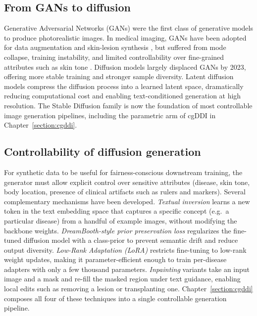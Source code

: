 \documentclass[11pt]{ucthesis}
\begin{document}
\subsection{From GANs to diffusion}

Generative Adversarial Networks (GANs) \cite{goodfellow-2020} were the first class of generative models to produce photorealistic images. In medical imaging, GANs have been adopted for data augmentation \cite{han-2018,Kawahara2018-7pt} and skin-lesion synthesis \cite{abid_2022_meaningfully,sagers-2023}, but suffered from mode collapse, training instability, and limited controllability over fine-grained attributes such as skin tone \cite{qin-2020}. Diffusion models \cite{Ho2020DenoisingDP,dhariwal_2021_diffusion} largely displaced GANs by 2023, offering more stable training and stronger sample diversity. Latent diffusion models \cite{rombach-2022,razzhigaev-2023} compress the diffusion process into a learned latent space, dramatically reducing computational cost and enabling text-conditioned generation at high resolution. The Stable Diffusion family is now the foundation of most controllable image generation pipelines, including the parametric arm of cgDDI in Chapter~\ref{section:cgddi}.

\subsection{Controllability of diffusion generation}

For synthetic data to be useful for fairness-conscious downstream training, the generator must allow explicit control over sensitive attributes (disease, skin tone, body location, presence of clinical artifacts such as rulers and markers). Several complementary mechanisms have been developed. \emph{Textual inversion} \cite{gal2023an,zeng-2024} learns a new token in the text embedding space that captures a specific concept (e.g.\ a particular disease) from a handful of example images, without modifying the backbone weights. \emph{DreamBooth-style prior preservation loss} \cite{ruiz-2023} regularizes the fine-tuned diffusion model with a class-prior to prevent semantic drift and reduce output diversity. \emph{Low-Rank Adaptation (LoRA)} \cite{hu2022lora} restricts fine-tuning to low-rank weight updates, making it parameter-efficient enough to train per-disease adapters with only a few thousand parameters. \emph{Inpainting} variants \cite{razzhigaev-2023,meng_2022_sdedit} take an input image and a mask and re-fill the masked region under text guidance, enabling local edits such as removing a lesion or transplanting one. Chapter~\ref{section:cgddi} composes all four of these techniques into a single controllable generation pipeline.
\end{document}
